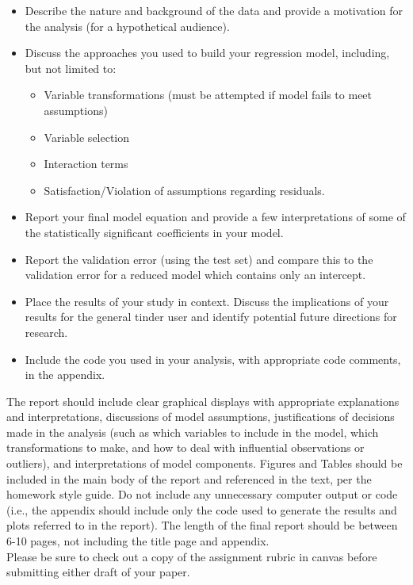 \documentclass[12pt]{report}
\begin{document}
\begin{itemize}
\item Describe the nature and background of the data and provide a motivation for the analysis (for a hypothetical audience). 
\item Discuss the approaches you used to build your regression model, including, but not limited to:
\begin{itemize}
\item Variable transformations (must be attempted if model fails to meet assumptions)
\item Variable selection 
\item Interaction terms
\item Satisfaction/Violation of assumptions regarding residuals. 
\end{itemize}
\item Report your final model equation and provide a few interpretations of some of the statistically significant coefficients in your model. 
\item Report the validation error (using the test set) and compare this to the validation error for a reduced model which contains only an intercept. 
\item Place the results of your study in context. Discuss the implications of your results for the general tinder user and identify potential future directions for research. 
\item Include the code you used in your analysis, with appropriate code comments, in the appendix. 
\end{itemize}


The report should include clear graphical displays with appropriate
explanations and interpretations, discussions of model assumptions,
justifications of decisions made in the analysis (such as which
variables to include in the model, which transformations to make,
and how to deal with influential observations or outliers), and interpretations of model
components. Figures and Tables should be included in the main body
of the report and referenced in the text, per the homework style guide.  Do not include any unnecessary computer output or
code (i.e., the appendix should include only the code used to
generate the results and plots referred to in the report).  The length of the final report should be between 6-10 pages, not including the title page and appendix.\\

Please be sure to check out a copy of the assignment rubric in canvas before submitting either draft of your paper. 
\end{document}
